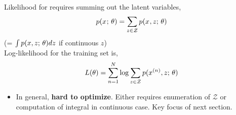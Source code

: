 \begin{frame}
Likelihood for requires summing out the latent variables,
    \[p(x^{} ; \, \theta) = \sum_{z \in \mathcal{Z}} p(x^{}, z ; \, \theta) \]
    (= $\int p(x, z ; \, \theta) dz$ if continuous $z$)\\
    \vspace{3mm}
Log-likelihood for the training set is,
\[  L(\theta) =  \sum_{n=1}^N \log \sum_{z \in \mathcal{Z}} p(x^{(n)} , z ; \, \theta)  \]

\begin{itemize}
\item In general, \textbf{hard to optimize}. Either requires enumeration of $\mathcal{Z}$
or computation of integral in continuous case. Key focus of next section. 
\end{itemize}

\end{frame}





